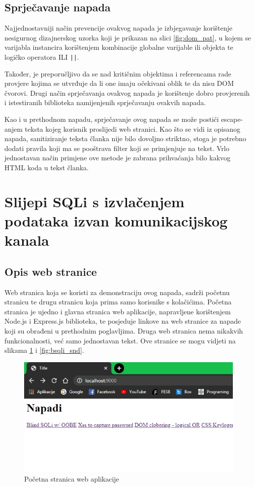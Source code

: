 \documentclass[12pt, oneside, onecolumn]{book}
\begin{document}
{\subsection{Sprječavanje napada}
Najjednostavniji način prevencije ovakvog napada je izbjegavanje korištenje nesigurnog dizajnerskog uzorka koji je prikazan na slici \ref{fig:dom_pat}, u kojem se varijabla instancira korištenjem kombinacije globalne varijable ili objekta te logičko operatora ILI \texttt{||}.

Također, je preporučljivo da se nad kritičnim objektima i referencama rade provjere kojima se utvrđuje da li one imaju očekivani oblik te da nisu DOM čvorovi. Drugi način sprječavanja ovakvog napada je korištenje dobro provjerenih i istestiranih biblioteka namijenjenih sprječavanju ovakvih napada.

Kao i u prethodnom napadu, sprječavanje ovog napada se može postići escape-anjem teksta kojeg korisnik proslijedi web stranici. Kao što se vidi iz opisanog napada, sanitiziranje teksta članka nije bilo dovoljno striktno, stoga je potrebno dodati pravila koji ma se pooštrava filter koji se primjenjuje na tekst. Vrlo jednostavan način primjene ove metode je zabrana prihvaćanja bilo kakvog HTML koda u tekst članka.

\section{Slijepi SQLi s izvlačenjem podataka izvan komunikacijskog kanala} \label{sqli}
\subsection{Opis web stranice}
Web stranica koja se koristi za demonstraciju ovog napada, sadrži početnu stranicu te  drugu stranicu koja prima samo korisnike s kolačićima. Početna stranica je ujedno i glavna stranica web aplikacije, napravljene korištenjem Node.js i Express.js biblioteka, te posjeduje linkove na web stranice za napade koji su obrađeni u prethodnim poglavljima. Druga web stranica nema nikakvih funkcionalnosti, već samo jednostavan tekst. Ove stranice se mogu vidjeti na slikama \ref{fig:bsqli_main} i \ref{fig:bsqli_snd}.

\begin{figure}[H]
	\begin{center}
		\includegraphics[width=\textwidth]{bsqli_main.jpg}
		\caption{Početna stranica web aplikacije} \label{fig:bsqli_main}
	\end{center}
\end{figure}

}
\end{document}
